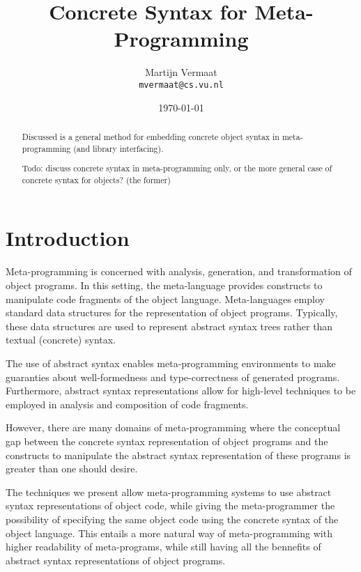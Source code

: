 \documentclass[a4paper,11pt]{article}
\title{Concrete Syntax for Meta-Programming}
\author{Martijn Vermaat\\
\texttt{mvermaat@cs.vu.nl}}
\date{\today}
\begin{document}
\maketitle


\lstset{
  numbers=none,
  basicstyle=\footnotesize\ttfamily,
  frame=tb,
  language=Pascal,
  captionpos=b,
  xleftmargin=1em,
  xrightmargin=1em,
  aboveskip=1em,
  belowskip=1em
}


\begin{abstract}
Discussed is a general method for embedding concrete object syntax in
meta-programming (and library interfacing).

Todo: discuss concrete syntax in meta-programming only, or the more
general case of concrete syntax for objects? (the former)
\end{abstract}


\section{Introduction}\label{sec:introduction}

Meta-programming is concerned with analysis, generation, and transformation
of object programs. In this setting, the meta-language provides constructs
to manipulate code fragments of the object language. Meta-languages employ
standard data structures for the representation of object programs. Typically,
these data structures are used to represent abstract syntax trees rather
than textual (concrete) syntax.

The use of abstract syntax enables meta-programming environments to make
guaranties about well-formedness and type-correctness of generated programs.
Furthermore, abstract syntax representations allow for high-level techniques
to be employed in analysis and composition of code fragments.

However, there are many domains of meta-programming where the conceptual gap
between the concrete syntax representation of object programs and the constructs
to manipulate the abstract syntax representation of these programs is greater
than one should desire.

The techniques we present allow meta-programming systems to use abstract
syntax representations of object code, while giving the meta-programmer the
possibility of specifying the same object code using the concrete syntax of
the object language. This entails a more natural way of meta-programming with
higher readability of meta-programs, while still having all the bennefits of
abstract syntax representations of object programs.
\end{document}
